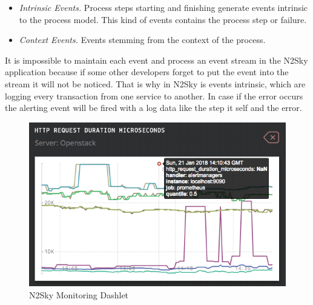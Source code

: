 \begin{itemize}
\item \emph{Intrinsic Events.} Process steps starting and finishing generate events intrinsic to the process model. This kind of events contains the process step or failure. 
\item \emph{Context Events.} Events stemming from the context of the process.
\end{itemize}

It is impossible to maintain each event and process an event stream in the N2Sky application because if some other developers forget to put the event into the stream it will not be noticed. That is why in N2Sky is events intrinsic, which are logging every transaction from one service to another. In case if the error occurs the alerting event will be fired with a log data like the step it self and the error. 

 
\begin{figure}[htbp]
\begin{center}
  \includegraphics[scale=0.65]{components/3/components/monitoring_dashlet.png}
  \caption{N2Sky Monitoring Dashlet}
  \label{fig:monitoring_dashlet}
\end{center}
\end{figure}

